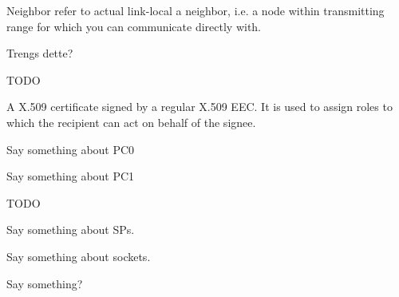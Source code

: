 \begin{acronym}
	Neighbor refer to actual link-local a neighbor, i.e. a node within
	transmitting range for which you can communicate directly with.

	Trengs dette?




	TODO

	A X.509 certificate signed by a regular X.509 EEC. It is used to assign roles
	to which the recipient can act on behalf of the signee.

	Say something about PC0
	
	Say something about PC1
	
	




	TODO

	Say something about SPs.


	Say something about sockets.

	Say something?


\end{acronym}
